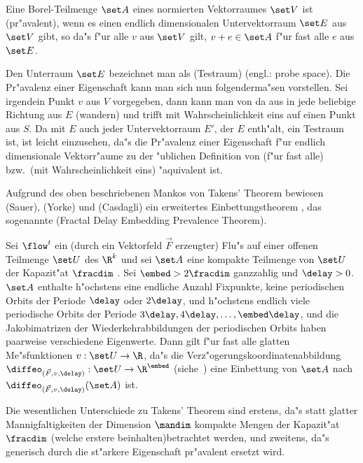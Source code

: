 \begin{definition}
Eine Borel-Teilmenge $\set A$ eines normierten Vektorraumes $\set V$ ist \begriff(pr"avalent), wenn
es einen endlich dimensionalen Untervektorraum $\set E$ aus $\set V$ gibt, so da"s f"ur alle $v$ aus
$\set V$ gilt, $v+e\in \set A$ f"ur fast alle $e$ aus $\set E$.
\end{definition}
Den Unterraum $\set E$ bezeichnet man als \begriff(Testraum) (engl.: probe space). Die Pr"avalenz
einer Eigenschaft  kann man sich nun folgenderma"sen vorstellen. Sei irgendein
Punkt $v$ aus $V$ vorgegeben, dann kann man von da aus in jede beliebige Richtung aus $E$
\naja(wandern) und trifft mit Wahrscheinlichkeit eins auf einen Punkt aus $S$. Da mit $E$
auch jeder Untervektorraum $E'$, der $E$ enth"alt, ein Testraum ist, ist leicht
einzusehen, da"s die Pr"avalenz einer Eigenschaft f"ur endlich dimensionale Vektorr"aume zu
der "ublichen Definition von \naja(f"ur fast alle) bzw.\ \naja(mit Wahrscheinlichkeit
eins) "aquivalent ist.


Aufgrund des oben beschriebenen Mankos von Takens' Theorem bewiesen \autor(Sauer),
\autor(Yorke) und \autor(Casdagli) ein erweitertes Einbettungstheorem \cite{Sauer91}, das
sogenannte \begriff(Fractal Delay Embedding Prevalence Theorem).

\begin{theorem}
  Sei $\flow^t$ ein (durch ein Vektorfeld $\vec F$ erzeugter) Flu"s auf einer offenen Teilmenge $\set U$ des $\R^k$ und sei $\set A$
  eine kompakte Teilmenge von $\set U$ der Kapazit"at $\fracdim$ . Sei $\embed>2\fracdim$ ganzzahlig und $\delay>0$. $\set A$ enthalte
  h"ochstens eine endliche Anzahl Fixpunkte, keine periodischen Orbits der Periode
  $\delay$ oder $2\delay$, und h"ochstens endlich viele periodische Orbits der Periode
  $3\delay,4\delay,\dots,\embed\delay$, und die Jakobimatrizen der Wiederkehrabbildungen der
  periodischen Orbits haben paarweise verschiedene Eigenwerte. Dann
  gilt f"ur fast alle glatten Me"sfunktionen $v:\set U\to\R$, da"s die
  Verz"ogerungskoordinatenabbildung $\diffeo_{(\vec F,v,\delay)}:\set U\to\R^\embed$
  (siehe~) eine Einbettung von $\set A$ nach  $\diffeo_{(\vec
    F,v,\delay)}(\set A)$ 
  ist.
\end{theorem}
Die wesentlichen Unterschiede zu Takens' Theorem sind erstens, da"s statt glatter
Mannigfaltigkeiten der Dimension $\mandim$ kompakte Mengen der Kapazit"at $\fracdim$
(welche erstere beinhalten)betrachtet werden, und zweitens, da"s generisch durch die
st"arkere Eigenschaft pr"avalent ersetzt wird.

